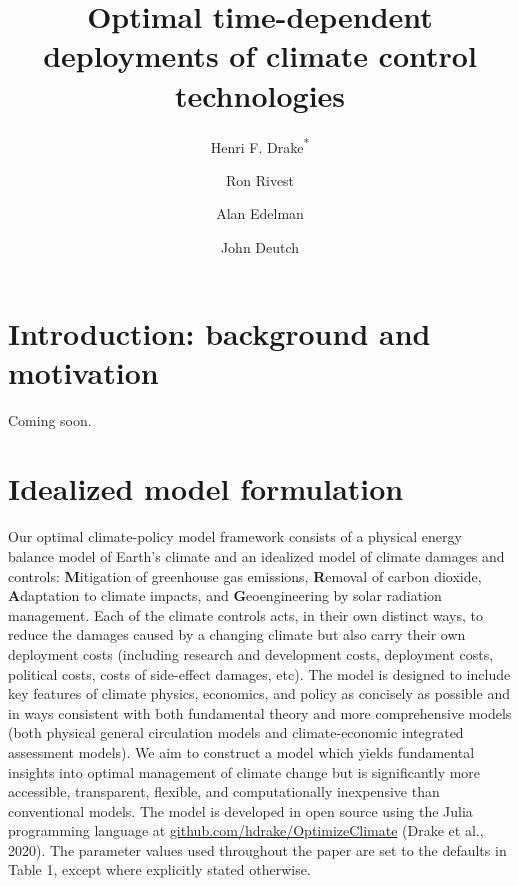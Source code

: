 \documentclass{article}
\title{Optimal time-dependent deployments of climate control technologies}
\author[1,2]{Henri F. Drake\textsuperscript{*}}
\author[1]{Ron Rivest}
\author[1]{Alan Edelman}
\author[1]{John Deutch}
\affil[1]{Massachusetts Institute of Technology, Cambridge, MA, USA}
\affil[2]{Woods Hole Oceanographic Institution, Woods Hole, MA, USA}
\date{}             %
\begin{document}
\maketitle

\section{Introduction: background and motivation}







Coming soon.

\section{Idealized model formulation}

Our optimal climate-policy model framework consists of a physical energy balance model of Earth's climate and an idealized model of climate damages and controls: \textbf{M}itigation of greenhouse gas emissions, \textbf{R}emoval of carbon dioxide, \textbf{A}daptation to climate impacts, and \textbf{G}eoengineering by solar radiation management. Each of the climate controls acts, in their own distinct ways, to reduce the damages caused by a changing climate but also carry their own deployment costs (including research and development costs, deployment costs, political costs, costs of side-effect damages, etc). The model is designed to include key features of climate physics, economics, and policy as concisely as possible and in ways consistent with both fundamental theory and more comprehensive models (both physical general circulation models and climate-economic integrated assessment models). We aim to construct a model which yields fundamental insights into optimal management of climate change but is significantly more accessible, transparent, flexible, and computationally inexpensive than conventional models. The model is developed in open source using the Julia programming language \citep{bezanson_julia:_2017} at \href{github.com/hdrake/OptimizeClimate}{github.com/hdrake/OptimizeClimate} (Drake et al., 2020). The parameter values used throughout the paper are set to the defaults in Table 1, except where explicitly stated otherwise.
\end{document}
